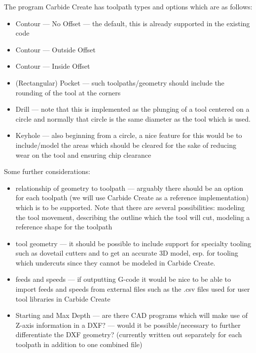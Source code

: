\documentclass{ltxdoc}
\begin{document}
The program Carbide Create has toolpath types and options which are as follows:

\begin{itemize}
 \item Contour --- No Offset --- the default, this is already supported in the existing code
 \item Contour --- Outside Offset
 \item Contour --- Inside Offset
 \item (Rectangular) Pocket --- such toolpaths/geometry should include the rounding of the tool 
       at the corners 
 \item Drill --- note that this is implemented as the plunging of a tool centered on a circle
                 and normally that circle is the same diameter as the tool which is used.
 \item Keyhole --- also beginning from a circle, a nice feature for this would be to 
                   include/model the areas which should be cleared for the sake of reducing wear
                   on the tool and ensuring chip clearance
\end{itemize}

 
Some further considerations:

\begin{itemize}
 \item relationship of geometry to toolpath --- arguably there should be an option for each
       toolpath (we will use Carbide Create as a reference implementation) which is to be 
       supported. Note that there are several possibilities: modeling the tool movement,
       describing the outline which the tool will cut, modeling a reference shape for the toolpath
 \item tool geometry --- it should be possible to include support for specialty tooling 
       such as dovetail cutters and to get an accurate 3D model, esp. for tooling which
       undercuts since they cannot be modeled in Carbide Create.
 \item feeds and speeds --- if outputting G-code it would be nice to be able to import feeds 
       and speeds from external files such as the .csv files used for user tool libraries in
       Carbide Create
 \item Starting and Max Depth --- are there CAD programs which will make use of Z-axis information 
       in a DXF? --- would it be possible/necessary to further differentiate the DXF geometry?
       (currently  written out separately for each toolpath in addition to one combined file)
\end{itemize}
\end{document}
